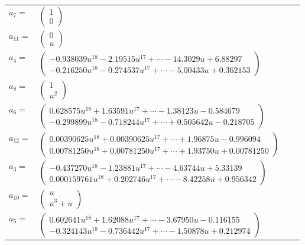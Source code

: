 \documentclass[1p]{elsarticle_modified}
\theoremstyle{definition}
\begin{document}
\begin{tabular}{m{7pt} m{180pt} m{7pt} m{180pt} }
\flushright $a_{7}=$&$\begin{pmatrix}1\\0\end{pmatrix}$ \\
\flushright $a_{11}=$&$\begin{pmatrix}0\\u\end{pmatrix}$ \\
\flushright $a_{4}=$&$\begin{pmatrix}-0.938039 u^{18}-2.19515 u^{17}+\cdots-14.3029 u+6.88297\\-0.216250 u^{18}-0.274537 u^{17}+\cdots-5.00433 u+0.362153\end{pmatrix}$ \\
\flushright $a_{8}=$&$\begin{pmatrix}1\\u^2\end{pmatrix}$ \\
\flushright $a_{6}=$&$\begin{pmatrix}0.628575 u^{18}+1.63591 u^{17}+\cdots-1.38123 u-0.584679\\-0.299899 u^{18}-0.718244 u^{17}+\cdots+0.505642 u-0.218705\end{pmatrix}$ \\
\flushright $a_{12}=$&$\begin{pmatrix}0.00390625 u^{18}+0.00390625 u^{17}+\cdots+1.96875 u-0.996094\\0.00781250 u^{18}+0.00781250 u^{17}+\cdots+1.93750 u+0.00781250\end{pmatrix}$ \\
\flushright $a_{3}=$&$\begin{pmatrix}-0.437270 u^{18}-1.23881 u^{17}+\cdots-4.63744 u+5.33139\\0.000159761 u^{18}+0.202746 u^{17}+\cdots-8.42258 u+0.956342\end{pmatrix}$ \\
\flushright $a_{10}=$&$\begin{pmatrix}u\\u^3+u\end{pmatrix}$ \\
\flushright $a_{5}=$&$\begin{pmatrix}0.602641 u^{18}+1.62088 u^{17}+\cdots-3.67950 u-0.116155\\-0.324143 u^{18}-0.736442 u^{17}+\cdots-1.50878 u+0.212974\end{pmatrix}$ \\

\end{tabular}
\end{document}

